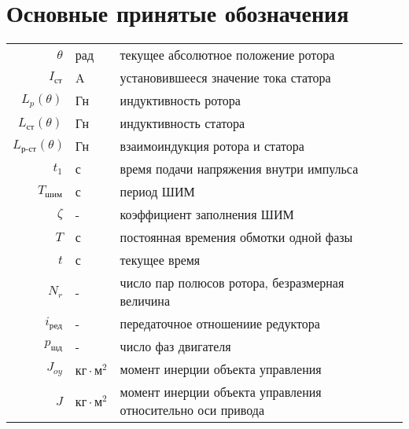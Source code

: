 \newpage
\section{Основные принятые обозначения}

\begin{table}[ht!]
    \begin{tabular}{rll}
    $\theta$            & рад & текущее абсолютное положение ротора \\

    $I_{\text{ст}}$     & A & установившееся значение тока статора \\

    $L_{p}(\theta)$     & Гн & индуктивность ротора \\

    $L_{\text{ст}}(\theta)$     & Гн & индуктивность статора \\

    $L_{\text{р-ст}}(\theta)$   & Гн & взаимоиндукция ротора и статора \\

    $t_{1}$             & с & время подачи напряжения внутри импульса \\

    $T_\text{шим}$      & с & период ШИМ \\

    $\zeta$             & - & коэффициент заполнения ШИМ \\

    $T$                 & с & постоянная времения обмотки одной фазы \\

    $t$                 & с & текущее время \\

    $N_{r}$             & - & число пар полюсов ротора, безразмерная величина \\

    $i_\text{ред}$      & - & передаточное отношениие редуктора \\

    $p_{\text{шд}}$     & - & число фаз двигателя \\

    $J_{oy}$            & $\text{кг} \cdot \text{м}^{2}$ & момент инерции объекта управления \\

    $J$                 & $\text{кг} \cdot \text{м}^{2}$ & момент инерции объекта управления относительно оси привода \\


\end{tabular}
\end{table}
